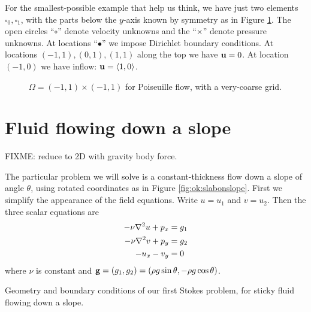 For the smallest-possible example that help us think, we have just two elements $\square_0,\square_1$, with the parts below the $y$-axis known by symmetry as in Figure \ref{fig:ok:poiseuille}.  The open circles ``{\large $\circ$}'' denote velocity unknowns and the ``$\times$'' denote pressure unknowns.  At locations ``$\bullet$'' we impose Dirichlet boundary conditions.  At locations $(-1,1),(0,1),(1,1)$ along the top we have $\mathbf{u}=0$.  At location $(-1,0)$ we have inflow: $\mathbf{u} = \left<1,0\right>$.

\begin{figure}

\caption{$\Omega=(-1,1)\times(-1,1)$ for Poiseuille flow, with a very-coarse grid.}
\label{fig:ok:poiseuille}
\end{figure}


\section{Fluid flowing down a slope}

FIXME: reduce to 2D with gravity body force.

The particular problem we will solve is a constant-thickness flow down a slope of angle $\theta$, using rotated coordinates as in Figure \ref{fig:ok:slabonslope}.  First we simplify the appearance of the field equations.  Write $u=u_1$ and $v=u_2$.  Then the three scalar equations are
\begin{align}
-\nu \nabla^2 u + p_x &= g_1 \label{eq:ok:stokes2du} \\
-\nu \nabla^2 v + p_y &= g_2 \label{eq:ok:stokes2dv} \\
- u_x - v_y &= 0 \label{eq:ok:stokes2dincomp}
\end{align}
where $\nu$ is constant and $\mathbf{g} = (g_1,g_2) = (\rho g \sin \theta, - \rho g \cos \theta)$.

\begin{marginfigure}

\caption{Geometry and boundary conditions of our first Stokes problem, for sticky fluid flowing down a slope.}
\label{fig:ok:slabonslope}
\end{marginfigure}

